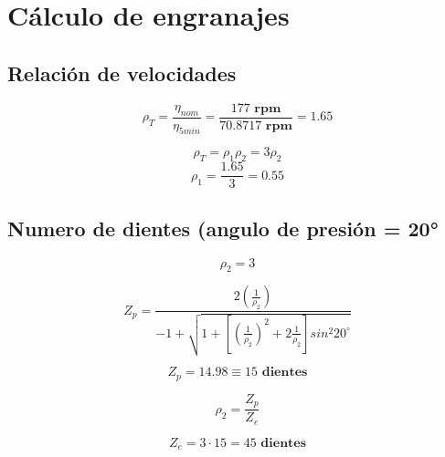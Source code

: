 \section{Cálculo de engranajes}
\subsection{Relación de velocidades}

\begin{center}
    $$\rho_{T} = \frac{\eta_{nom}}{\eta_{ 5min}} = \frac{177  \textbf{ rpm}}{70.8717 \textbf{ rpm}} = 1.65$$

    $$\rho_{T} = \rho_1\rho_2= 3\rho_2$$
    $$\rho_1 = \frac{1.65}{3} = 0.55$$
\end{center}
\subsection{Numero de dientes (angulo de presión = 20°}
\begin{center}

    $$\rho_2=3 $$
    
    $$Z_p = \frac{2(\frac{1}{\rho_2})}{-1 + \sqrt{1 + [(\frac{1}{\rho_2})^2 + 2\frac{1}{\rho_2}]sin^2 20^\circ}}$$

    

    $$Z_p = 14.98 \equiv 15 \textbf{ dientes}$$

    $$\rho_2 = \frac{Z_p}{Z_e}$$

    $$Z_e = 3 \cdot 15= 45 \textbf{ dientes}$$
    
\end{center}

\endinput 